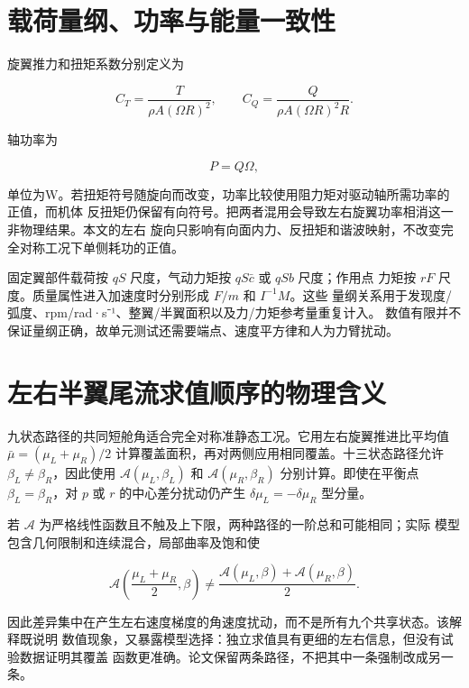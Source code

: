 \documentclass[UTF8,12pt,oneside,openany,fontset=windows]{ctexbook}
\begin{document}
\section{载荷量纲、功率与能量一致性}

旋翼推力和扭矩系数分别定义为

\begin{equation}
C_T=\frac{T}{\rho A(\Omega R)^2},\qquad
C_Q=\frac{Q}{\rho A(\Omega R)^2R}.
\end{equation}

轴功率为

\begin{equation}
P=Q\Omega,
\end{equation}

单位为W。若扭矩符号随旋向而改变，功率比较使用阻力矩对驱动轴所需功率的正值，而机体 反扭矩仍保留有向符号。把两者混用会导致左右旋翼功率相消这一非物理结果。本文的左右 旋向只影响有向面内力、反扭矩和谐波映射，不改变完全对称工况下单侧耗功的正值。

固定翼部件载荷按 \(qS\) 尺度，气动力矩按 \(qS\bar c\) 或 \(qSb\) 尺度；作用点 力矩按 \(rF\) 尺度。质量属性进入加速度时分别形成 \(F/m\) 和 \(I^{-1}M\)。这些 量纲关系用于发现度/弧度、rpm/rad·s⁻¹、整翼/半翼面积以及力/力矩参考量重复计入。 数值有限并不保证量纲正确，故单元测试还需要端点、速度平方律和人为力臂扰动。

\section{左右半翼尾流求值顺序的物理含义}

九状态路径的共同短舱角适合完全对称准静态工况。它用左右旋翼推进比平均值 \(\bar\mu=(\mu_L+\mu_R)/2\) 计算覆盖面积，再对两侧应用相同覆盖。十三状态路径允许 \(\beta_L\ne\beta_R\)，因此使用 \(\mathcal A(\mu_L,\beta_L)\) 和 \(\mathcal A(\mu_R,\beta_R)\) 分别计算。即使在平衡点 \(\beta_L=\beta_R\)，对 \(p\) 或 \(r\) 的中心差分扰动仍产生 \(\delta\mu_L=-\delta\mu_R\) 型分量。

若 \(\mathcal A\) 为严格线性函数且不触及上下限，两种路径的一阶总和可能相同；实际 模型包含几何限制和连续混合，局部曲率及饱和使

\begin{equation}
\mathcal A\!\left(\frac{\mu_L+\mu_R}{2},\beta\right)
\ne\frac{\mathcal A(\mu_L,\beta)+\mathcal A(\mu_R,\beta)}{2}.
\end{equation}

因此差异集中在产生左右速度梯度的角速度扰动，而不是所有九个共享状态。该解释既说明 数值现象，又暴露模型选择：独立求值具有更细的左右信息，但没有试验数据证明其覆盖 函数更准确。论文保留两条路径，不把其中一条强制改成另一条。
\end{document}

